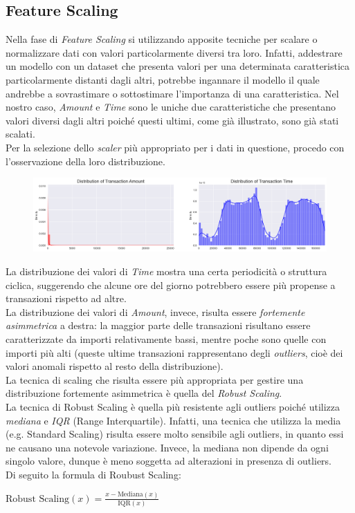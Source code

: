 \documentclass[]{article}
\begin{document}
    \subsection{Feature Scaling}
        Nella fase di \textit{Feature Scaling} si utilizzando apposite tecniche per scalare o normalizzare dati con valori particolarmente diversi tra loro. Infatti, addestrare un modello con un dataset che presenta valori per una determinata caratteristica particolarmente distanti dagli altri, potrebbe ingannare il modello il quale andrebbe a sovrastimare o sottostimare l'importanza di una caratteristica. Nel nostro caso, \textit{Amount} e \textit{Time} sono le uniche due caratteristiche che presentano valori diversi dagli altri poiché questi ultimi, come già illustrato, sono già stati scalati.\\
        Per la selezione dello \textit{scaler} più appropriato per i dati in questione, procedo con l'osservazione della loro distribuzione.
        \begin{figure}[H]
            \centering
            \includegraphics[width=.9\textwidth]{img/valuesDistribution.png}
            \caption[short]{}
        \end{figure}
        La distribuzione dei valori di \textit{Time} mostra una certa periodicità o struttura ciclica, suggerendo che alcune ore del giorno potrebbero essere più propense a transazioni rispetto ad altre.\\
        La distribuzione dei valori di \textit{Amount}, invece, risulta essere \textit{fortemente asimmetrica} a destra: la maggior parte delle transazioni risultano essere caratterizzate da importi relativamente bassi, mentre poche sono quelle con importi più alti (queste ultime transazioni rappresentano degli \textit{outliers}, cioè dei valori anomali rispetto al resto della distribuzione).\\
        La tecnica di scaling che risulta essere più appropriata per gestire una distribuzione fortemente asimmetrica è quella del \textit{Robust Scaling}.\\
        La tecnica di Robust Scaling è quella più resistente agli outliers poiché utilizza \textit{mediana} e \textit{IQR} (Range Interquartile). Infatti, una tecnica che utilizza la media (e.g. Standard Scaling) risulta essere molto sensibile agli outliers, in quanto essi ne causano una notevole variazione. Invece, la mediana non dipende da ogni singolo valore, dunque è meno soggetta ad alterazioni in presenza di outliers.\\
        Di seguito la formula di Roubust Scaling:\\
        \begin{center}
            $\text{Robust Scaling}(x) = \frac{x - \text{Mediana}(x)}{\text{IQR}(x)}$
        \end{center}
\end{document}

